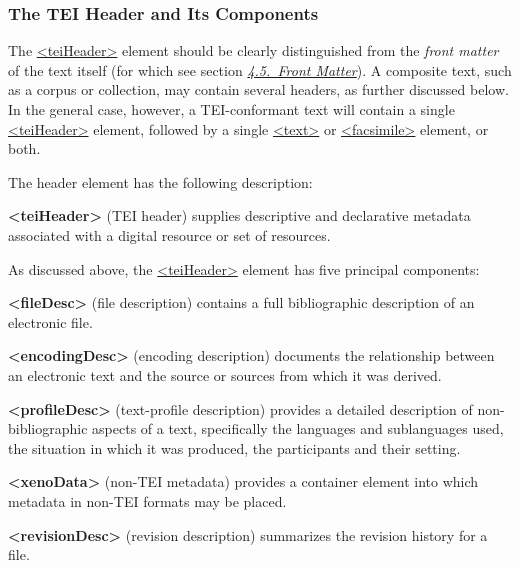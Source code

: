 \subsubsection[{The TEI Header and Its Components}]{The TEI Header and Its Components}\label{HD11}\par
The \hyperref[TEI.teiHeader]{<teiHeader>} element should be clearly distinguished from the \textit{front matter} of the text itself (for which see section \textit{\hyperref[DSFRONT]{4.5.\ Front Matter}}). A composite text, such as a corpus or collection, may contain several headers, as further discussed below. In the general case, however, a TEI-conformant text will contain a single \hyperref[TEI.teiHeader]{<teiHeader>} element, followed by a single \hyperref[TEI.text]{<text>} or \hyperref[TEI.facsimile]{<facsimile>} element, or both.\par
The header element has the following description: 
\begin{sansreflist}
  
\item [\textbf{<teiHeader>}] (TEI header) supplies descriptive and declarative metadata associated with a digital resource or set of resources.
\end{sansreflist}
\par
As discussed above, the \hyperref[TEI.teiHeader]{<teiHeader>} element has five principal components: 
\begin{sansreflist}
  
\item [\textbf{<fileDesc>}] (file description) contains a full bibliographic description of an electronic file.
\item [\textbf{<encodingDesc>}] (encoding description) documents the relationship between an electronic text and the source or sources from which it was derived.
\item [\textbf{<profileDesc>}] (text-profile description) provides a detailed description of non-bibliographic aspects of a text, specifically the languages and sublanguages used, the situation in which it was produced, the participants and their setting.
\item [\textbf{<xenoData>}] (non-TEI metadata) provides a container element into which metadata in non-TEI formats may be placed.
\item [\textbf{<revisionDesc>}] (revision description) summarizes the revision history for a file.
\end{sansreflist}
\par

